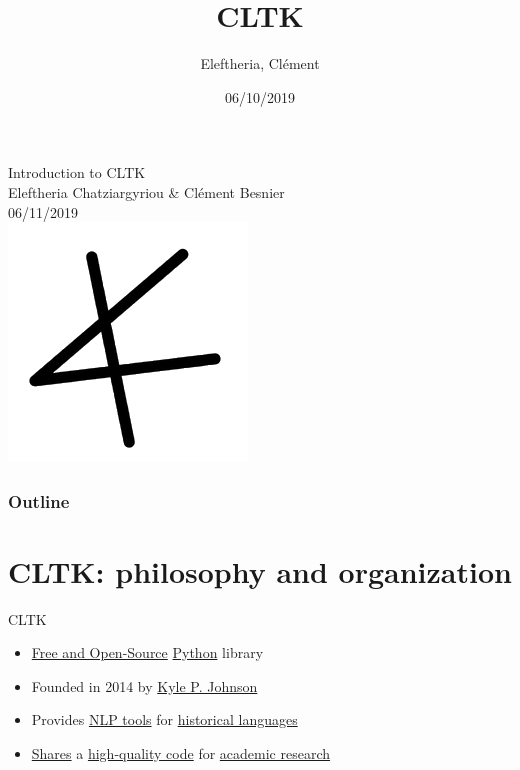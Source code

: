\documentclass{beamer}
\title{CLTK}
\author{Eleftheria, Clément}
\institute{CLTK}
\date{06/10/2019}
\begin{document}
\begin{frame}
\begin{center}
    {\large Introduction to CLTK}\\
    Eleftheria Chatziargyriou \& Clément Besnier \\
    06/11/2019 \\
    \includegraphics[scale=0.5]{cltklogo.png}
\end{center}

\end{frame}

\begin{frame}
\frametitle{Outline}
\tableofcontents
\end{frame}

\section{CLTK: philosophy and organization}


\begin{frame}{CLTK}
\begin{itemize}
    \item \underline{Free and Open-Source} \underline{Python} library
    \pause
    \item Founded in 2014 by \underline{Kyle P. Johnson}
    \pause
    \item Provides \underline{NLP tools} for \underline{historical languages}
    \pause
    \item \underline{Shares} a \underline{high-quality code} for \underline{academic research}
    
\end{itemize}{}
    
\end{frame}{}
\end{document}
